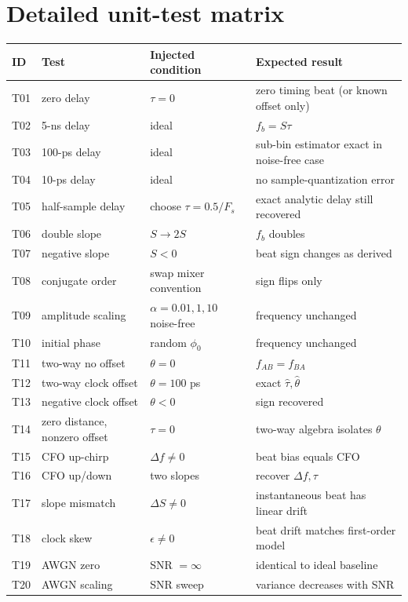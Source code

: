 \documentclass[11pt]{article}
\begin{document}
\section{Detailed unit-test matrix}
\begin{longtable}{@{}p{}p{}p{}p{}@{}}
\toprule ID & Test & Injected condition & Expected result \\ \midrule
T01 & zero delay & $\tau=0$ & zero timing beat (or known offset only) \\
T02 & 5-ns delay & ideal & $f_b=S\tau$ \\
T03 & 100-ps delay & ideal & sub-bin estimator exact in noise-free case \\
T04 & 10-ps delay & ideal & no sample-quantization error \\
T05 & half-sample delay & choose $\tau=0.5/F_s$ & exact analytic delay still recovered \\
T06 & double slope & $S\rightarrow2S$ & $f_b$ doubles \\
T07 & negative slope & $S<0$ & beat sign changes as derived \\
T08 & conjugate order & swap mixer convention & sign flips only \\
T09 & amplitude scaling & $\alpha=0.01,1,10$ noise-free & frequency unchanged \\
T10 & initial phase & random $\phi_0$ & frequency unchanged \\
T11 & two-way no offset & $\theta=0$ & $f_{AB}=f_{BA}$ \\
T12 & two-way clock offset & $\theta=100$ ps & exact $\hat\tau,\hat\theta$ \\
T13 & negative clock offset & $\theta<0$ & sign recovered \\
T14 & zero distance, nonzero offset & $\tau=0$ & two-way algebra isolates $\theta$ \\
T15 & CFO up-chirp & $\Delta f\ne0$ & beat bias equals CFO \\
T16 & CFO up/down & two slopes & recover $\Delta f,\tau$ \\
T17 & slope mismatch & $\Delta S\ne0$ & instantaneous beat has linear drift \\
T18 & clock skew & $\epsilon\ne0$ & beat drift matches first-order model \\
T19 & AWGN zero & SNR $=\infty$ & identical to ideal baseline \\
T20 & AWGN scaling & SNR sweep & variance decreases with SNR \\

\end{longtable}
\end{document}
